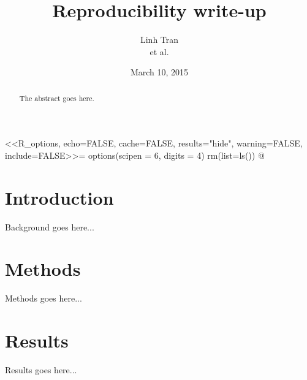 \documentclass{article}\usepackage[]{graphicx}\usepackage[]{color}
\title{Reproducibility write-up}
\author{Linh Tran \\
		et al.}
\date{March 10, 2015}
\renewcommand{\indent}{\hskip 20pt}
\begin{document}
\maketitle

<<R_options, echo=FALSE, cache=FALSE, results="hide", warning=FALSE,
include=FALSE>>= options(scipen = 6, digits = 4)
rm(list=ls())
@


\begin{abstract}

The abstract goes here.

\end{abstract}


\section{Introduction}

\indent Background goes here...
\newline


\section{Methods}

\indent Methods goes here...
\newline


\section{Results}

\indent Results goes here...
\newline
\end{document}
